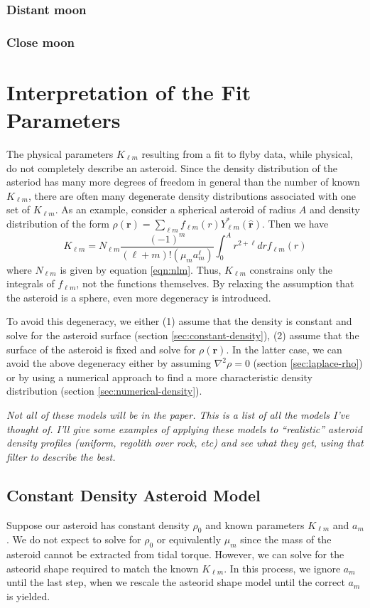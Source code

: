 \documentclass[11pt]{article}
\newcommand{\unit}[1]{\hat{\mathbf{#1}}}
\newcommand{\jtd}[1]{{\color{red}\textit{#1}}}
\begin{document}
\subsubsection{Distant moon}

\subsubsection{Close moon}




\section{Interpretation of the Fit Parameters}
The physical parameters $K_{\ell m}$ resulting from a fit to flyby data, while physical, do not completely describe an asteroid. Since the density distribution of the asteriod has many more degrees of freedom in general than the number of known $K_{\ell m}$, there are often many degenerate density distributions associated with one set of $K_{\ell m}$. As an example, consider a spherical asteroid of radius $A$ and density distribution of the form $\rho(\bm r) = \sum_{\ell m} f_{\ell m}(r) Y_{\ell m}^*(\unit r)$. Then we have
\begin{equation}
K_{\ell m} = N_{\ell m} \frac{(-1)^m}{(\ell + m)!(\mu_m a_m^\ell)}\int_0^A r^{2+\ell} dr f_{\ell m}(r)
\end{equation}
where $N_{\ell m}$ is given by equation \ref{eqn:nlm}. Thus, $K_{\ell m}$ constrains only the integrals of $f_{\ell m}$, not the functions themselves. By relaxing the assumption that the asteroid is a sphere, even more degeneracy is introduced.

To avoid this degeneracy, we either (1) assume that the density is constant and solve for the asteroid surface (section \ref{sec:constant-density}), (2) assume that the surface of the asteroid is fixed and solve for $\rho(\bm r)$. In the latter case, we can avoid the above degeneracy either by assuming $\nabla^2 \rho = 0$ (section \ref{sec:laplace-rho}) or by using a numerical approach to find a more characteristic density distribution (section \ref{sec:numerical-density}).

\jtd{Not all of these models will be in the paper. This is a list of all the models I've thought of. I'll give some examples of applying these models to ``realistic'' asteroid density profiles (uniform, regolith over rock, etc) and see what they get, using that filter to describe the best.}

\subsection{Constant Density Asteroid Model}
Suppose our asteroid has constant density $\rho_0$ and known parameters $K_{\ell m}$ and $a_m$. We do not expect to solve for $\rho_0$ or equivalently $\mu_m$ since the mass of the asteroid cannot be extracted from tidal torque. However, we can solve for the asteorid shape required to match the known $K_{\ell m}$. In this process, we ignore $a_m$ until the last step, when we rescale the asteorid shape model until the correct $a_m$ is yielded.
\end{document}
